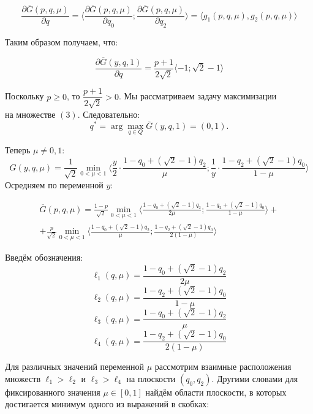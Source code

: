 \begin{flushleft}
	\begin{equation}
		\frac{\partial \overline G(p,q,\mu)}{\partial q}
		=\langle \frac{\partial \overline G(p,q,\mu)}{\partial q_0};
		\frac{\partial \overline G(p,q,\mu)}{\partial q_2} \rangle=
		\langle g_1(p,q,\mu), g_2(p,q,\mu) \rangle
	\end{equation}

	Таким образом получаем, что:	
	
	$$
		\frac{\partial \overline G(y,q,1)}{\partial q}
		=\frac{p+1}{2\sqrt{2}} \langle -1; \sqrt{2}-1\rangle
	$$
	
	Поскольку $p \geqslant 0$, то $\dfrac{p+1}{2\sqrt{2}} > 0 $.
	Мы рассматриваем задачу максимизации \\ на множестве $(3)$.
	Следовательно:
	$$q^* = \arg \max \limits_{q\in Q} \overline G(y,q,1)=(0,1).$$

		
	\textbf{} Теперь $\mu \neq 0,1$:
	$$
		G(y,q,\mu)=\frac{1}{\sqrt{2}}\min \limits_{0<\mu<1}
		\big \langle
			\frac{y}{2} \cdot \frac{1-q_0+(\sqrt{2}-1)q_2}{\mu};
			\frac{1}{y} \cdot \frac{1-q_2+(\sqrt{2}-1)q_0}{1-\mu}
		\big \rangle	
	$$
	Осредняем по переменной $y$:	

	\begin{multline}
		\overline G(p,q,\mu)=\frac{1-p}{\sqrt{2}}\min \limits_{0<\mu<1}
		\big \langle
			\frac{1-q_0+(\sqrt{2}-1)q_2}{2\mu};
			\frac{1-q_2+(\sqrt{2}-1)q_0}{1-\mu}
		\big \rangle + \\
		+\frac{p}{\sqrt{2}}\min \limits_{0<\mu<1}
		\big \langle
			\frac{1-q_0+(\sqrt{2}-1)q_2}{\mu};
			\frac{1-q_2+(\sqrt{2}-1)q_0}{2(1-\mu)}
		\big \rangle 
	\end{multline}
	
	Введём обозначения:
	$$\ell_1(q,\mu)=\frac{1-q_0+(\sqrt{2}-1)q_2}{2\mu}$$
	$$\ell_2(q,\mu)=\frac{1-q_2+(\sqrt{2}-1)q_0}{1-\mu}$$
	$$\ell_3(q,\mu)=\frac{1-q_0+(\sqrt{2}-1)q_2}{\mu}$$
	$$\ell_4(q,\mu)=\frac{1-q_2+(\sqrt{2}-1)q_0}{2(1-\mu)}$$
	
	Для различных значений переменной $\mu$ рассмотрим 
	взаимные расположения множеств $\ell_1>\ell_2$ и $\ell_3>\ell_4$
	на плоскости $(q_0,q_2)$. Другими словами для фиксированного 
	значения $\mu \in [0,1]$ найдём области плоскости, в которых 
	достигается минимум одного из выражений в скобках:
	

\end{flushleft}
